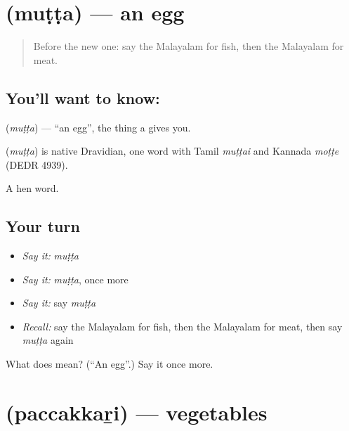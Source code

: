 \section[\texorpdfstring{\ml{മുട്ട} (muṭṭa)}{മുട്ട (muṭṭa)}]{ (muṭṭa) — an egg}

\label{lesson:ML-C131-egg}



\begin{quote}
Before the new one: say the Malayalam for fish, then the Malayalam for meat.
\end{quote}

\subsection*{You'll want to know: }
\textbf{} (\emph{muṭṭa}) — \textquotedblleft{}an egg\textquotedblright{}, the thing a \textbf{} gives you.

\begin{cousinweb}
\textbf{} (\emph{muṭṭa}) is native Dravidian, one word with Tamil \emph{muṭṭai} and Kannada \emph{moṭṭe} (DEDR 4939).
\end{cousinweb}

\begin{grammarlens}[title={What you've built}]
A hen word.
\end{grammarlens}

\subsection*{Your turn}
\begin{itemize}
\raggedright
  \item \emph{Say it:} \emph{muṭṭa}
  \item \emph{Say it:} \emph{muṭṭa}, once more
  \item \emph{Say it:} say \emph{muṭṭa}
  \item \emph{Recall:} say the Malayalam for fish, then the Malayalam for meat, then say \emph{muṭṭa} again
\end{itemize}

\begin{tcolorbox}[breakable,colback=teal!4,colframe=teal!35!black,title={Before you move on}]
What does  mean? (\textquotedblleft{}An egg\textquotedblright{}.) Say it once more.
\end{tcolorbox}
\section[\texorpdfstring{\ml{പച്ചക്കറി} (paccakkaṟi)}{പച്ചക്കറി (paccakkaṟi)}]{ (paccakkaṟi) — vegetables}

